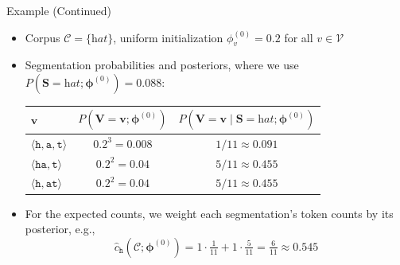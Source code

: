 \documentclass[11pt,compress,t,notes=noshow, xcolor=table]{beamer}
\newcommand{\vocab}{\mathcal{V}}
\newcommand{\probs}{\boldsymbol{\phi}}
\begin{document}
\begin{frame}{Example (Continued)}
 
\vfill
 
\begin{itemize}
\item Corpus $\mathcal{C} = \{\textit{hat}\}$, uniform initialization $\phi^{(0)}_v = 0.2$ for all $v \in \vocab$
\item Segmentation probabilities and posteriors, where we use $P(\mathbf{S} = \textit{hat}; \probs^{(0)}) = 0.088$:
\begin{center}
\renewcommand{\arraystretch}{1.3}
\begin{tabular}{lcc}
$\mathbf{v}$ & $P(\mathbf{V} = \mathbf{v}; \probs^{(0)})$ & $P(\mathbf{V} = \mathbf{v} \mid \mathbf{S} = \textit{hat}; \probs^{(0)})$ \\
\hline
\rule{0pt}{2.8ex}$\langle \texttt{h}, \texttt{a}, \texttt{t} \rangle$ & $0.2^3 = 0.008$ & $1/11 \approx 0.091$ \\
$\langle \texttt{ha}, \texttt{t} \rangle$ & $0.2^2 = 0.04$ & $5/11 \approx 0.455$ \\
$\langle \texttt{h}, \texttt{at} \rangle$ & $0.2^2 = 0.04$ & $5/11 \approx 0.455$
\end{tabular}
\end{center}
\item For the expected counts, we weight each segmentation's token counts by its posterior, e.g.,
\begin{equation*}
\hat{c}_{\texttt{h}}(\mathcal{C}; \probs^{(0)}) = 1 \cdot \tfrac{1}{11} + 1 \cdot \tfrac{5}{11} = \tfrac{6}{11} \approx 0.545
\end{equation*}
\end{itemize}
 
\vfill
 
\end{frame}
 
\end{document}
